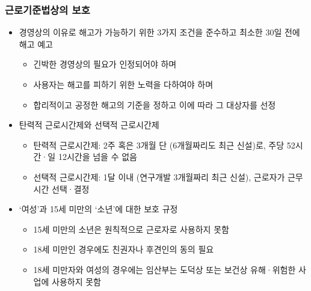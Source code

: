 \documentclass[aspectratio=169,xcolor=dvipsnames,handout]{beamer}
\begin{document}
\begin{frame}[allowframebreaks]
    \frametitle{근로기준법상의 보호}
    \begin{itemize}[<+->]
        \item 경영상의 이유로 해고가 가능하기 위한 3가지 조건을 준수하고 최소한 30일 전에 해고 예고
        \begin{itemize}
            \item 긴박한 경영상의 필요가 인정되어야 하며
            \item 사용자는 해고를 피하기 위한 노력을 다하여야 하며
            \item 합리적이고 공정한 해고의 기준을 정하고 이에 따라 그 대상자를 선정
        \end{itemize}
        \item 탄력적 근로시간제와 선택적 근로시간제
        \begin{itemize}
            \item 탄력적 근로시간제: 2주 혹은 3개월 단 (6개월짜리도 최근 신설)로, 주당 52시간·일 12시간을 넘을 수 없음
            \item 선택적 근로시간제: 1달 이내 (연구개발 3개월짜리 최근 신설), 근로자가 근무시간 선택·결정
        \end{itemize}
        \item `여성'과 15세 미만의 `소년'에 대한 보호 규정
        \begin{itemize}
            \item 15세 미만의 소년은 원칙적으로 근로자로 사용하지 못함 
            \item 18세 미만인 경우에도 친권자나 후견인의 동의 필요
            \item 18세 미만자와 여성의 경우에는 임산부는 도덕상 또는 보건상 유해·위험한 사업에 사용하지 못함
        \end{itemize}
    \end{itemize}
\end{frame}
\end{document}

